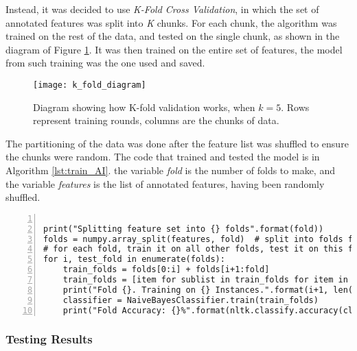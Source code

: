 Instead, it was decided to use \emph{K-Fold Cross Validation}\cite{Hastie2009}, in which the set of annotated features was split into \emph{K} chunks. For each chunk, the algorithm was trained on the rest of the data, and tested on the single chunk, as shown in the diagram of Figure \ref{fig:k_fold_diagram}. It was then trained on the entire set of features, the model from such training was the one used and saved.

\begin{figure}[ht]
\texttt{[image: k\_fold\_diagram]}
\caption{Diagram showing how K-fold validation works, when $k=5$. Rows represent training rounds, columns are the chunks of data.}
\label{fig:k_fold_diagram}
\end{figure}

The partitioning of the data was done after the feature list was shuffled to ensure the chunks were random. The code that trained and tested the model is in Algorithm \ref{lst:train_AI}. the variable \emph{fold} is the number of folds to make, and the variable \emph{features} is the list of annotated features, having been randomly shuffled.

\begin{lstlisting}[float=ht,
				   numbers=left,
				   caption={Snippet of code that trains and tests the classification algorithm},
				   label={lst:train_AI}]

print("Splitting feature set into {} folds".format(fold))
folds = numpy.array_split(features, fold)  # split into folds for training
# for each fold, train it on all other folds, test it on this fold
for i, test_fold in enumerate(folds):
    train_folds = folds[0:i] + folds[i+1:fold]
    train_folds = [item for sublist in train_folds for item in sublist] # flatten list
    print("Fold {}. Training on {} Instances.".format(i+1, len(train_folds)))
    classifier = NaiveBayesClassifier.train(train_folds)
    print("Fold Accuracy: {}%".format(nltk.classify.accuracy(classifier, test_fold)))
\end{lstlisting}

\subsubsection{Testing Results}

